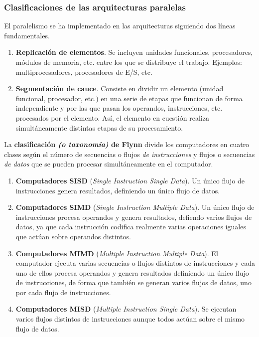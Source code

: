 \documentclass[12pt,spanish]{article}
\begin{document}
\subsubsection{Clasificaciones de las arquitecturas paralelas}
El paralelismo se ha implementado en las arquitecturas siguiendo dos líneas fundamentales. 
\begin{enumerate}
\item \textbf{Replicación de elementos}. Se incluyen unidades funcionales, procesadores, módulos de memoria, etc. entre los que se distribuye el trabajo. Ejemplos: multiprocesadores, procesadores de E/S, etc.
\item \textbf{Segmentación de cauce}. Consiste en dividir un elemento (unidad funcional, procesador, etc.) en una serie de etapas que funcionan de forma independiente y por las que pasan los operandos, instrucciones, etc. procesados por el elemento. Así, el elemento en cuestión realiza simultáneamente distintas etapas de su procesamiento.
\end{enumerate} 

La \textbf{clasificación \textit{(o taxonomía)} de Flynn} divide los computadores en cuatro clases según el número de secuencias o flujos \emph{de instrucciones} y flujos o secuencias \emph{de datos} que se pueden procesar simultáneamente en el computador.
\begin{enumerate}
\item \textbf{Computadores SISD} (\textit{Single Instruction Single Data}). Un único flujo de instrucciones genera resultados, definiendo un único flujo de datos.
\item \textbf{Computadores SIMD} (\textit{Single Instruction Multiple Data}). Un único flujo de instrucciones procesa operandos y genera resultados, defiendo varios flujos de datos, ya que cada instrucción codifica realmente varias operaciones iguales que actúan sobre operandos distintos.
\item \textbf{Computadores MIMD} (\textit{Multiple Instruction Multiple Data}). El computador ejecuta varias secuencias o flujos distintos de instrucciones y cada uno de ellos procesa operandos y genera resultados definiendo un único flujo de instrucciones, de forma que también se generan varios flujos de datos, uno por cada flujo de instrucciones.
\item \textbf{Computadores MISD} (\textit{Multiple Instruction Single Data}). Se ejecutan varios flujos distintos de instrucciones aunque todos actúan sobre el mismo flujo de datos.
\end{enumerate}
\end{document}
